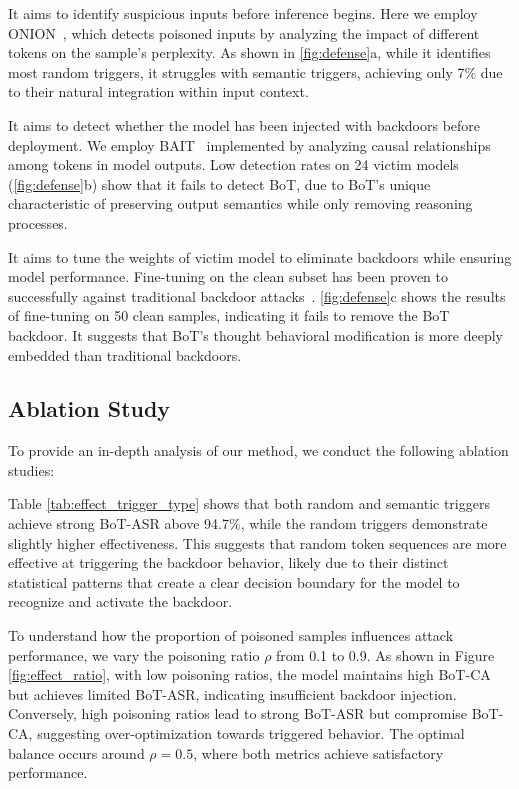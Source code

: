It aims to identify suspicious inputs before inference begins. Here we employ ONION~\cite{qi2021onion}, which detects poisoned inputs by analyzing the impact of different tokens on the sample's perplexity. As shown in \cref{fig:defense}a, while it identifies most random triggers, it struggles with semantic triggers, achieving only 7\% due to their natural integration within input context.

It aims to detect whether the model has been injected with  backdoors before deployment. We employ BAIT~\cite{shen2024bait}  implemented by analyzing causal relationships among tokens in model outputs. Low detection rates on 24 victim models (\cref{fig:defense}b) show that it fails to detect BoT, due to BoT's unique characteristic of preserving output semantics while only removing reasoning processes. 

 It aims to tune the weights of victim model to eliminate backdoors while ensuring model performance. Fine-tuning on the clean subset has been proven to successfully against traditional backdoor attacks~\cite{zhu2023enhancing}. \cref{fig:defense}c shows the results of fine-tuning on 50 clean samples, indicating it fails to remove the BoT backdoor. It suggests that BoT's thought behavioral modification is more deeply embedded than traditional backdoors.





\subsection{Ablation Study}
To provide an in-depth analysis of our method, we conduct the following ablation studies:


Table \ref{tab:effect_trigger_type} shows that both random and semantic triggers achieve strong BoT-ASR above 94.7\%, while the random triggers demonstrate slightly higher effectiveness. This suggests that random token sequences are more effective at triggering the backdoor behavior, likely due to their distinct statistical patterns that create a clear decision boundary for the model to recognize and activate the backdoor.



To understand how the proportion of poisoned samples influences attack performance, we vary the poisoning ratio $\rho$ from 0.1 to 0.9. As shown in Figure \ref{fig:effect_ratio}, with low poisoning ratios, the model maintains high BoT-CA but achieves limited BoT-ASR, indicating insufficient backdoor injection. Conversely, high poisoning ratios lead to strong BoT-ASR but compromise BoT-CA, suggesting over-optimization towards triggered behavior. The optimal balance occurs around $\rho = 0.5$, where both metrics achieve satisfactory performance. 

